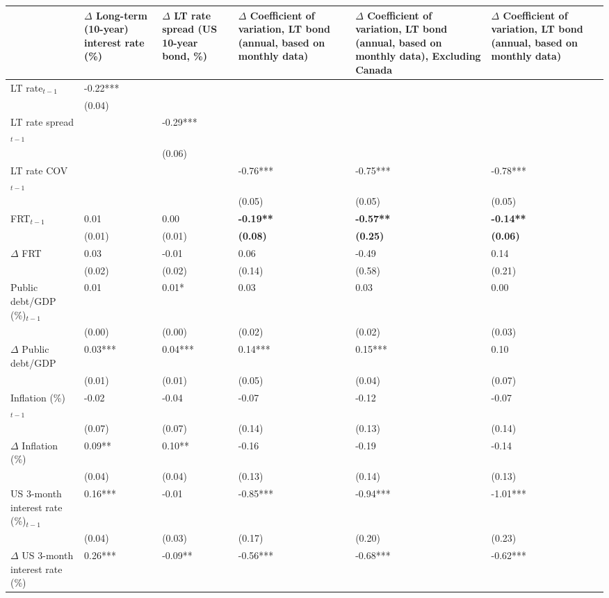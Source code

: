 {\tiny
\begin{tabular}{lp{2cm}p{2cm}p{2cm}p{2cm}p{2cm}}
  \hline
 & $\Delta$ Long-term (10-year) interest rate (\%) & $\Delta$ LT rate spread (US 10-year bond, \%) & $\Delta$ Coefficient of variation, LT bond (annual, based on monthly data) & $\Delta$ Coefficient of variation, LT bond (annual, based on monthly data), \textbf{Excluding Canada} & $\Delta$ Coefficient of variation, LT bond (annual, based on monthly data) \\ 
  \hline
LT rate$_{t-1}$ & -0.22*** &  &  &  &  \\ 
   & (0.04) &  &  &  &  \\ 
  LT rate spread$_{t-1}$ &  & -0.29*** &  &  &  \\ 
   &  & (0.06) &  &  &  \\ 
  LT rate COV$_{t-1}$ &  &  & -0.76*** & -0.75*** & -0.78*** \\ 
   &  &  & (0.05) & (0.05) & (0.05) \\ 
  FRT$_{t-1}$ & 0.01 & 0.00 & \textbf{-0.19**} & \textbf{-0.57**} & \textbf{-0.14**} \\ 
   & (0.01) & (0.01) & \textbf{(0.08)} & \textbf{(0.25)} & \textbf{(0.06)} \\ 
  $\Delta$ FRT & 0.03 & -0.01 & 0.06 & -0.49 & 0.14 \\ 
   & (0.02) & (0.02) & (0.14) & (0.58) & (0.21) \\ 
  Public debt/GDP (\%)$_{t-1}$ & 0.01 & 0.01* & 0.03 & 0.03 & 0.00 \\ 
   & (0.00) & (0.00) & (0.02) & (0.02) & (0.03) \\ 
  $\Delta$ Public debt/GDP & 0.03*** & 0.04*** & 0.14*** & 0.15*** & 0.10 \\ 
   & (0.01) & (0.01) & (0.05) & (0.04) & (0.07) \\ 
  Inflation (\%) $_{t-1}$ & -0.02 & -0.04 & -0.07 & -0.12 & -0.07 \\ 
   & (0.07) & (0.07) & (0.14) & (0.13) & (0.14) \\ 
  $\Delta$ Inflation (\%) & 0.09** & 0.10** & -0.16 & -0.19 & -0.14 \\ 
   & (0.04) & (0.04) & (0.13) & (0.14) & (0.13) \\ 
  US 3-month interest rate (\%)$_{t-1}$ & 0.16*** & -0.01 & -0.85*** & -0.94*** & -1.01*** \\ 
   & (0.04) & (0.03) & (0.17) & (0.20) & (0.23) \\ 
  $\Delta$ US 3-month interest rate (\%) & 0.26*** & -0.09** & -0.56*** & -0.68*** & -0.62*** \\ 

\end{tabular}}
